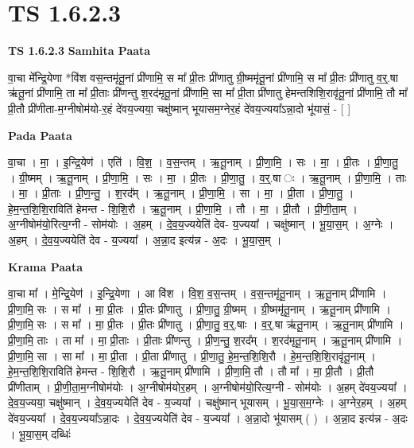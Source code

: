 \documentclass[17pt]{extarticle}
\begin{document}
\section*{ TS 1.6.2.3 }

\textbf{TS 1.6.2.3 } \newline
\textbf{Samhita Paata} \newline

वा॒चा मे᳚न्द्रि॒येणा *वि॑श वस॒न्तमृ॑तू॒नां प्री॑णामि॒ स मा᳚ प्री॒तः प्री॑णातु ग्री॒ष्ममृ॑तू॒नां प्री॑णामि॒ स मा᳚ प्री॒तः प्री॑णातु व॒र्॒.षा ऋ॑तू॒नां प्री॑णामि॒ ता मा᳚ प्री॒ताः प्री॑णन्तु श॒रद॑मृतू॒नां प्री॑णामि॒ सा मा᳚ प्री॒ता प्री॑णातु हेमन्तशिशि॒रावृ॑तू॒नां प्री॑णामि॒ तौ मा᳚ प्री॒तौ प्री॑णीता-म॒ग्नीषोम॑यो-र॒हं दे॑वय॒ज्यया॒ चक्षु॑ष्मान् भूयासम॒ग्नेर॒हं दे॑वय॒ज्यया᳚ऽन्ना॒दो भू॑यासं॒ - [ ] \newline

\textbf{Pada Paata} \newline

वा॒चा । मा॒ । इ॒न्द्रि॒येण॑ । एति॑ । वि॒श॒ । व॒स॒न्तम् । ऋ॒तू॒नाम् । प्री॒णा॒मि॒ । सः । मा॒ । प्री॒तः । प्री॒णा॒तु॒ । ग्री॒ष्मम् । ऋ॒तू॒नाम् । प्री॒णा॒मि॒ । सः । मा॒ । प्री॒तः । प्री॒णा॒तु॒ । व॒र्॒.षा ः । ऋ॒तू॒नाम् । प्री॒णा॒मि॒ । ताः । मा॒ । प्री॒ताः । प्री॒ण॒न्तु॒ । श॒रद᳚म् । ऋ॒तू॒नाम् । प्री॒णा॒मि॒ । सा । मा॒ । प्री॒ता । प्री॒णा॒तु॒ । हे॒म॒न्त॒शि॒शि॒राविति॑ हेमन्त - शि॒शि॒रौ । ऋ॒तू॒नाम् । प्री॒णा॒मि॒ । तौ । मा॒ । प्री॒तौ । प्री॒णी॒ता॒म् । अ॒ग्नीषोम॑यो॒रित्य॒ग्नी - सोम॑योः । अ॒हम् । दे॒व॒य॒ज्ययेति॑ देव- य॒ज्यया᳚ । चक्षु॑ष्मान् । भू॒या॒स॒म् । अ॒ग्नेः । अ॒हम् । दे॒व॒य॒ज्ययेति॑ देव - य॒ज्यया᳚ । अ॒न्ना॒द इत्य॑न्न - अ॒दः । भू॒या॒स॒म् ।  \newline


\textbf{Krama Paata} \newline

वा॒चा मा᳚ । मे॒न्द्रि॒येण॑ । इ॒न्द्रि॒येणा । आ वि॑श । वि॒श॒ व॒स॒न्तम् । व॒स॒न्तमृ॑तू॒नाम् । ऋ॒तू॒नाम् प्री॑णामि । प्री॒णा॒मि॒ सः । स मा᳚ । मा॒ प्री॒तः । प्री॒तः प्री॑णातु । प्री॒णा॒तु॒ ग्री॒ष्मम् । ग्री॒ष्ममृ॑तू॒नाम् । ऋ॒तू॒नाम् प्री॑णामि । प्री॒णा॒मि॒ सः । स मा᳚ । मा॒ प्री॒तः । प्री॒तः प्री॑णातु । प्री॒णा॒तु॒ व॒र्॒.षाः । व॒र्॒.षा ऋ॑तू॒नाम् । ऋ॒तू॒नाम् प्री॑णामि । प्री॒णा॒मि॒ ताः । ता मा᳚ । मा॒ प्री॒ताः । प्री॒ताः प्री॑णन्तु । प्री॒ण॒न्तु॒ श॒रद᳚म् । श॒रद॑मृतू॒नाम् । ऋ॒तू॒नाम् प्री॑णामि । प्री॒णा॒मि॒ सा । सा मा᳚ । मा॒ प्री॒ता । प्री॒ता प्री॑णातु । प्री॒णा॒तु॒ हे॒म॒न्त॒शि॒शि॒रौ । हे॒म॒न्त॒शि॒शि॒रावृ॑तू॒नाम् । हे॒म॒न्त॒शि॒शि॒राविति॑ हेमन्त - शि॒शि॒रौ । ऋ॒तू॒नाम् प्री॑णामि । प्री॒णा॒मि॒ तौ । तौ मा᳚ । मा॒ प्री॒तौ । प्री॒तौ प्री॑णीताम् । प्री॒णी॒ता॒म॒ग्नीषोम॑योः । अ॒ग्नीषोम॑योर॒हम् । अ॒ग्नीषोम॑यो॒रित्य॒ग्नी - सोम॑योः । अ॒हम् दे॑वय॒ज्यया᳚ । दे॒व॒य॒ज्यया॒ चक्षु॑ष्मान् । दे॒व॒य॒ज्ययेति॑ देव - य॒ज्यया᳚ । चक्षु॑ष्मान् भूयासम् । भू॒या॒स॒म॒ग्नेः । अ॒ग्नेर॒हम् । अ॒हम् दे॑वय॒ज्यया᳚ । दे॒व॒य॒ज्यया᳚ऽन्ना॒दः । दे॒व॒य॒ज्ययेति॑ देव - य॒ज्यया᳚ । अ॒न्ना॒दो भू॑यासम् ( ) । अ॒न्ना॒द इत्य॑न्न - अ॒दः । भू॒या॒स॒म् दब्धिः॑ \newline
\end{document}
